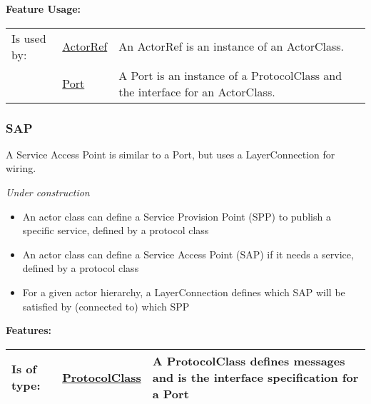 		
		
	\begingroup
	\textbf{Feature Usage:}
	\renewcommand{\arraystretch}{1.8} %
	\begin{longtable}{l|l p{}}
		\hline
	Is used by: & \tabitem \hyperlink{ref:ActorRef}{ActorRef}  & An ActorRef is an instance of an ActorClass.\\
	& \tabitem \hyperlink{ref:Port}{Port}  & A Port is an instance of a ProtocolClass and the interface for an ActorClass. \\
	\hline
	\end{longtable}
	\endgroup
		
	
	\vspace{\baselineskip}
	\vspace{\baselineskip}
	\vspace{\baselineskip}
	
\subsubsection{SAP}
	\hypertarget{ref:SAP}{}
	A Service Access Point is similar to a Port, but uses a LayerConnection for wiring.
		
	\emph{\large Under construction}
	\begin{itemize}
	\item An actor class can define a Service Provision Point (SPP) to publish a specific service, defined by a protocol class
	\item An actor class can define a Service Access Point (SAP) if it needs a service, defined by a protocol class
	\item For a given actor hierarchy, a LayerConnection defines which SAP will be satisfied by (connected to) which SPP
	\end{itemize}
		
		
	\begingroup
	\textbf{Features:}
	\renewcommand{\arraystretch}{1.8} %
	\begin{longtable}{l|l p{}}
		\hline
	Is of type: & \tabitem \hyperlink{ref:ProtocolClass}{ProtocolClass}  & A ProtocolClass defines messages and is the interface specification for a Port\\
	\hline
	\end{longtable}
	\endgroup
		
